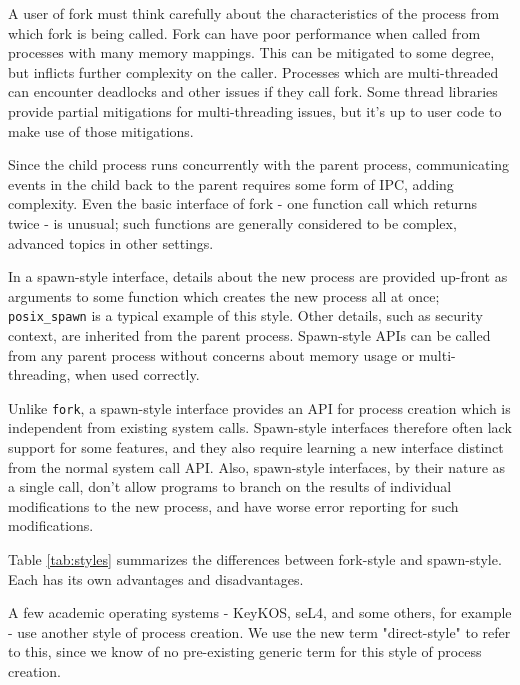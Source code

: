 \documentclass[letterpaper,twocolumn,10pt]{article}
\begin{document}
A user of fork must think carefully about the characteristics of the process from which fork is being called.
Fork can have poor performance when called from processes with many memory mappings.\cite{forkroad}
This can be mitigated to some degree, but inflicts further complexity on the caller.\cite{vfork}\cite{vfork_dangerous}
Processes which are multi-threaded can encounter deadlocks and other issues if they call fork.
\cite{forkroad}\cite{tlpi}\cite{posix_spawn_error_pipe}
Some thread libraries provide partial mitigations for multi-threading issues,
but it's up to user code to make use of those mitigations.\cite{pthread_atfork}

Since the child process runs concurrently with the parent process,
communicating events in the child back to the parent requires some form of IPC,
adding complexity.\cite{posix_spawn_error_pipe}
Even the basic interface of fork - one function call which returns twice - is unusual;
such functions are generally considered to be complex, advanced topics in other settings.
\cite{callcc_fork}\cite{continuations}\cite{bashcc}

In a spawn-style interface,
details about the new process are provided up-front as arguments to some function
which creates the new process all at once;
\texttt{posix\_spawn} is a typical example of this style.\cite{posix_spawn}\cite{create_process}\cite{chainloading}
Other details, such as security context, are inherited from the parent process.\cite{tlpi}\cite{create_process}
Spawn-style APIs
can be called from any parent process without concerns about memory usage or multi-threading,
when used correctly.
\cite{forkroad}\cite{posix_spawn_error_pipe}

Unlike \texttt{fork}, a spawn-style interface provides an API for process creation
which is independent from existing system calls.\cite{spawn_h}\cite{subprocess_run}
Spawn-style interfaces therefore often lack support for some features,
and they also require learning a new interface distinct from the normal system call API.\cite{tlpi}\cite{posix_spawn_lwn}
Also, spawn-style interfaces, by their nature as a single call,
don't allow programs to branch on the results of individual modifications to the new process,
and have worse error reporting for such modifications.
\cite{posix_spawn}\cite{posix_spawn_error_pipe}

Table \ref{tab:styles} summarizes the differences between fork-style and spawn-style.
Each has its own advantages and disadvantages.

A few academic operating systems - KeyKOS, seL4, and some others, for example -
use another style of process creation.\cite{keykos}\cite{sel4}\cite{exokernel}\cite{fuschia}\cite{singularity}
We use the new term "direct-style" to refer to this,
since we know of no pre-existing generic term for this style of process creation.
\end{document}
